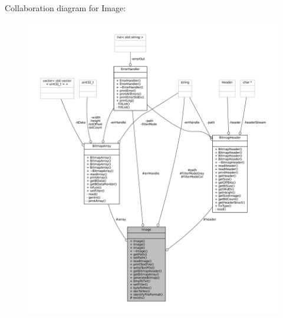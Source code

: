 Collaboration diagram for Image\+:
\nopagebreak
\begin{figure}[H]
\begin{center}
\leavevmode
\includegraphics[width=350pt]{classImage__coll__graph}
\end{center}
\end{figure}
